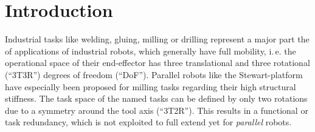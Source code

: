 \documentclass[robotics,article,submit,moreauthors,pdftex]{Definitions/mdpi}
\begin{document}

\section{Introduction}
\label{sec:intro}


Industrial tasks like welding, gluing, milling or drilling represent a major part the of applications of industrial robots, which generally have full mobility, i.\,e. the operational space of their end-effector has three translational and three rotational (``3T3R'') degrees of freedom (``DoF'').
Parallel robots like the Stewart-platform have especially been proposed for milling tasks regarding their high structural stiffness.
The task space of the named tasks can be defined by only two rotations due to a symmetry around the tool axis (``3T2R'').
This results in a functional or task redundancy, which is not exploited to full extend yet for \emph{parallel} robots.
\end{document}
